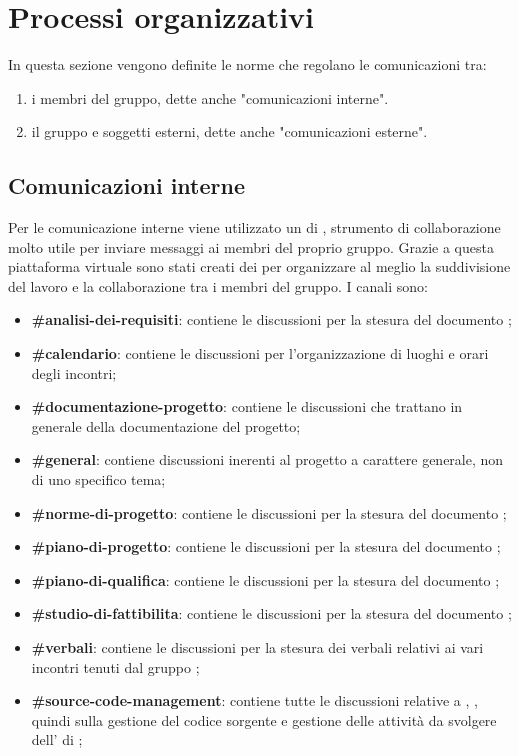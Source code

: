 \section{Processi organizzativi}
In questa sezione vengono definite le norme che regolano le comunicazioni tra:
\begin{enumerate}
	\item i membri del gruppo, dette anche "comunicazioni interne".
	\item il gruppo e soggetti esterni, dette anche "comunicazioni esterne".
\end{enumerate}
	
\subsection{Comunicazioni interne}
Per le comunicazione interne viene utilizzato un  di ,
strumento di collaborazione molto utile per inviare messaggi ai membri del proprio gruppo.
Grazie a questa piattaforma virtuale sono stati creati dei  per organizzare al meglio la suddivisione del lavoro e la collaborazione tra i membri del gruppo.
I canali sono:
\begin{itemize}
	\item \textbf{\#analisi-dei-requisiti}: contiene le discussioni per la stesura del documento \AdR{};
	\item \textbf{\#calendario}: contiene le discussioni per l’organizzazione di luoghi e orari degli incontri;
	\item \textbf{\#documentazione-progetto}: contiene le discussioni che trattano in generale della documentazione del progetto;
	\item \textbf{\#general}: contiene discussioni inerenti al progetto a carattere generale, non di uno specifico tema;
	\item \textbf{\#norme-di-progetto}: contiene le discussioni per la stesura del documento \NdP{};
    \item \textbf{\#piano-di-progetto}: contiene le discussioni per la stesura del documento \PdP{};
	\item \textbf{\#piano-di-qualifica}: contiene le discussioni per la stesura del documento \PdQ{};
	\item \textbf{\#studio-di-fattibilita}: contiene le discussioni per la stesura del documento \SdF{};
	\item \textbf{\#verbali}: contiene le discussioni per la stesura dei verbali relativi ai vari incontri tenuti dal gruppo \Gruppo{};
	\item \textbf{\#source-code-management}: contiene tutte le discussioni relative a , , quindi sulla gestione del codice sorgente e gestione delle attività da svolgere dell' di ;
\end{itemize}

